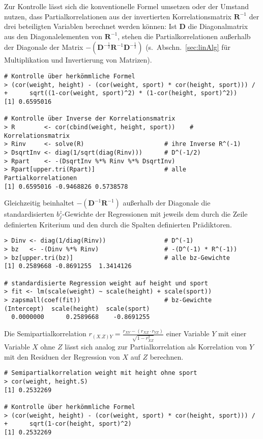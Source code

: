 Zur Kontrolle lässt sich die konventionelle Formel umsetzen oder der Umstand nutzen, dass Partialkorrelationen aus der invertierten Korrelationsmatrix $\bm{R}^{-1}$ der drei beteiligten Variablen berechnet werden können: Ist $\bm{D}$ die Diagonalmatrix aus den Diagonalelementen von $\bm{R}^{-1}$, stehen die Partialkorrelationen außerhalb der Diagonale der Matrix $-(\bm{D}^{-\frac{1}{2}} \bm{R}^{-1} \bm{D}^{-\frac{1}{2}})$ (s.\ Abschn.\ \ref{sec:linAlg} für Multiplikation und Invertierung von Matrizen).
\begin{lstlisting}
# Kontrolle über herkömmliche Formel
> (cor(weight, height) - (cor(weight, sport) * cor(height, sport))) /
+      sqrt((1-cor(weight, sport)^2) * (1-cor(height, sport)^2))
[1] 0.6595016

# Kontrolle über Inverse der Korrelationsmatrix
> R        <- cor(cbind(weight, height, sport))    # Korrelationsmatrix
> Rinv     <- solve(R)                      # ihre Inverse R^(-1)
> DsqrtInv <- diag(1/sqrt(diag(Rinv)))      # D^(-1/2)
> Rpart    <- -(DsqrtInv %*% Rinv %*% DsqrtInv)
> Rpart[upper.tri(Rpart)]                   # alle Partialkorrelationen
[1] 0.6595016 -0.9468826 0.5738578
\end{lstlisting}

Gleichzeitig beinhaltet $-(\bm{D}^{-1} \bm{R}^{-1})$ außerhalb der Diagonale die standardisierten $b_{j}^{z}$-Gewichte der Regressionen mit jeweils dem durch die Zeile definierten Kriterium und den durch die Spalten definierten Prädiktoren.
\begin{lstlisting}
> Dinv <- diag(1/diag(Rinv))                # D^(-1)
> bz   <- -(Dinv %*% Rinv)                  # -(D^(-1) * R^(-1))
> bz[upper.tri(bz)]                         # alle bz-Gewichte
[1] 0.2589668 -0.8691255  1.3414126

# standardisierte Regression weight auf height und sport
> fit <- lm(scale(weight) ~ scale(height) + scale(sport))
> zapsmall(coef(fit))                       # bz-Gewichte
(Intercept)  scale(height)  scale(sport)
  0.0000000      0.2589668    -0.8691255
\end{lstlisting}

Die Semipartialkorrelation $r_{(X.Z)Y} = \frac{r_{XY} - (r_{XZ} \cdot r_{YZ})}{\sqrt{1-r_{XZ}^{2}}}$ einer Variable $Y$ mit einer Variable $X$ ohne $Z$ lässt sich analog zur Partialkorrelation als Korrelation von $Y$ mit den Residuen der Regression von $X$ auf $Z$ berechnen.
\begin{lstlisting}
# Semipartialkorrelation weight mit height ohne sport
> cor(weight, height.S)
[1] 0.2532269

# Kontrolle über herkömmliche Formel
> (cor(weight, height) - (cor(weight, sport) * cor(height, sport))) /
+      sqrt(1-cor(height, sport)^2)
[1] 0.2532269
\end{lstlisting}

